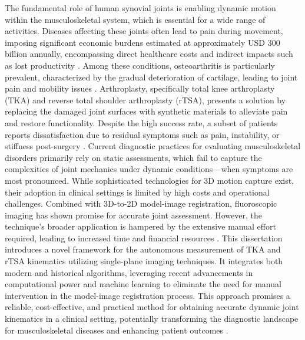 The fundamental role of human synovial joints is enabling dynamic motion within the musculoskeletal system, which is essential for a wide range of activities.
Diseases affecting these joints often lead to pain during movement, imposing significant economic burdens estimated at approximately USD 300 billion annually, encompassing direct healthcare costs and indirect impacts such as lost productivity \cite{BMUSBurdenMusculoskeletal}.
Among these conditions, osteoarthritis is particularly prevalent, characterized by the gradual deterioration of cartilage, leading to joint pain and mobility issues \cite{sharmaOsteoarthritisCompanionRheumatology2007}.
Arthroplasty, specifically total knee arthroplasty (TKA) and reverse total shoulder arthroplasty (rTSA), presents a solution by replacing the damaged joint surfaces with synthetic materials to alleviate pain and restore functionality.
Despite the high success rate, a subset of patients reports dissatisfaction due to residual symptoms such as pain, instability, or stiffness post-surgery \cite{bakerRolePainFunction2007,scottPredictingDissatisfactionFollowing2010, bournePatientSatisfactionTotal2010}.
Current diagnostic practices for evaluating musculoskeletal disorders primarily rely on static assessments, which fail to capture the complexities of joint mechanics under dynamic conditions—when symptoms are most pronounced.
While sophisticated technologies for 3D motion capture exist, their adoption in clinical settings is limited by high costs and operational challenges. Combined with 3D-to-2D model-image registration, fluoroscopic imaging has shown promise for accurate joint assessment.
However, the technique's broader application is hampered by the extensive manual effort required, leading to increased time and financial resources \cite{banksAccurateMeasurementThreedimensional1996, mahfouzRobustMethodRegistration2003}.
This dissertation introduces a novel framework for the autonomous measurement of TKA and rTSA kinematics utilizing single-plane imaging techniques.
It integrates both modern and historical algorithms, leveraging recent advancements in computational power and machine learning to eliminate the need for manual intervention in the model-image registration process.
This approach promises a reliable, cost-effective, and practical method for obtaining accurate dynamic joint kinematics in a clinical setting, potentially transforming the diagnostic landscape for musculoskeletal diseases and enhancing patient outcomes \cite{postolkaEvaluationIntensitybasedAlgorithm2020,floodAutomatedRegistration3D2018}.

